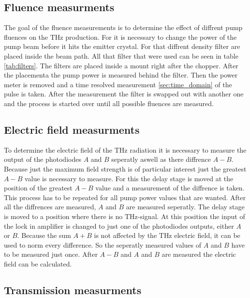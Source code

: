 \subsection{Fluence measurments}
The goal of the fluence measurements is to determine the effect of diffrent pump fluences on the $\si{\tera\hertz}$ production.
For it is necessary to change the power of the pump beam before it hits the emitter crystal.
For that diffrent density filter are placed inside the beam path.
All that filter that were used can be seen in table \ref{tab:filters}.
The filters are placed inside a mount right after the chopper.
After the placementa the pump power is measured behind the filter.
Then the power meter is removed and a time resolved measurement \ref{sec:time_domain} of the pulse is taken.
After the measurement the filter is swapped out with another one and the process is started over until all possible fluences are measured.
\subsection{Electric field measurments}
To determine the electric field of the $\si{\tera\hertz}$ radiation it is necessary to measure the output of the photodiodes $A$ and $B$ seperatly aswell as there diffrence $A-B$.
Because just the maximum field strength is of particular interest just the greatest $A-B$ value is necessary to measure.
For this the delay stage is moved at the position of the greatest $A-B$ value and a measurement of the diffrence is taken.
This process has to be repeated for all pump power values that are wanted.
After all the diffrences are measured, $A$ and $B$ are measured seperatly.
The delay stage is moved to a position where there is no $\si{\tera\hertz}$-signal.
At this position the input of the lock in amplifier is changed to just one of the photodiodes outputs, either $A$ or $B$.
Because the sum $A+B$ is not affected by the $\si{\tera\hertz}$ electric field, it can be used to norm every difference.
So the seperatly measured values of $A$ and $B$ have to be measured just once.
After $A-B$ and $A$ and $B$ are measured the electric field can be calculated.
\subsection{Transmission measurments}
